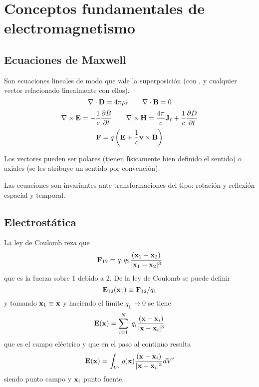 \documentclass[10pt,oneside]{CBFT_book}
\begin{document}
\chapter{Conceptos fundamentales de electromagnetismo}


\section{Ecuaciones de Maxwell}

Son ecuaciones lineales de modo que vale la superposición (con ,  y 
cualquier vector relacionado linealmente con ellos).
\[
	\nabla \cdot \vb{D} = 4 \pi \rho_\ell \qquad \nabla \cdot \vb{B} = 0
\]
\[
	\nabla \times \vb{E} = - \frac{1}{c} \dpar{B}{t} \qquad \nabla \times \vb{H} =
	\frac{4\pi}{c} \vb{J}_\ell + \frac{1}{c}\dpar{D}{t}
\]
\[
	\vb{F} = q \left( \vb{E} + \frac{1}{c} \vb{v} \times \vb{B} \right)
\]

Los vectores pueden ser polares (tienen físicamente bien definido el sentido) o
axiales (se les atribuye un sentido por convención).

Las ecuaciones son invariantes ante transformaciones del tipo: rotación
y reflexión espacial y temporal.

\section{Electrostática}

La ley de Coulomb reza que
\[
	\vb{F}_{12} = q_1 q_2 \frac{(\vb{x}_1 - \vb{x}_2)}{|\vb{x}_1 - \vb{x}_2 |^3}
\]
que es la fuerza sobre 1 debido a 2. De la ley de Coulomb se puede definir 
\[
	\vb{E}_{12}(\vb{x}_1) \equiv \vb{F}_{12}/q_1
\]
y tomando $\vb{x}_1 \equiv \vb{x}$ y haciendo el límite $q_1 \to 0$ se tiene
\[
	\vb{E}(\vb{x}) = \sum_{i=1}^N \; q_i \frac{(\vb{x} - \vb{x}_i)}{|\vb{x} - \vb{x}_i |^3}
\]
que es el campo eléctrico y que en el paso al continuo resulta
\[
	\vb{E}(\vb{x}) = \int_{V'} \rho(\vb{x}) \frac{(\vb{x} - \vb{x}_i)}{|\vb{x} - \vb{x}_i |^3} dV' 
\]
siendo  punto campo y $\vb{x}_i$ punto fuente.
\end{document}
